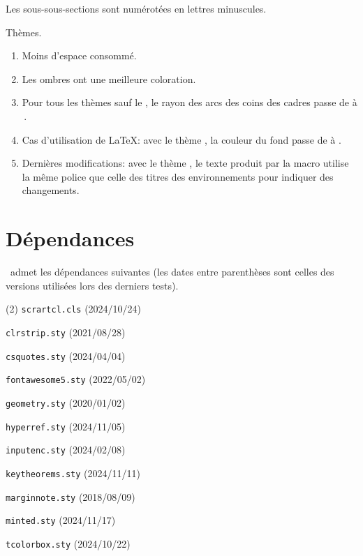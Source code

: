 {\begin{tdocupdate}
	\item Les sous-sous-sections sont numérotées en lettres minuscules.

	\item Thèmes.
	\begin{enumerate}
		\item Moins d'espace consommé.

		\item Les ombres ont une meilleure coloration.

		\item Pour tous les thèmes sauf le , le rayon des arcs des coins des cadres passe de \tdoclatexin{.75mm} à \tdoclatexin{.2pt}\,.

 		\item Cas d'utilisation de \LaTeX: avec le thème , la couleur du fond passe de  à .

		\item Dernières modifications: avec le thème , le texte \tdoclatexin{[Init]} produit par la macro  utilise la même police que celle des titres des environnements pour indiquer des changements.
	\end{enumerate}
\end{tdocupdate}
}


\newpage
\tableofcontents
\newpage


\section{Dépendances}

\thisproj\ admet les dépendances suivantes (les dates entre parenthèses sont celles des versions utilisées lors des derniers tests).
%
\begin{tasks}[style=itemize](2)
    \task \texttt{scrartcl.cls}
    \hfill {\small (2024/10/24)}\kern10pt

    \task \texttt{clrstrip.sty}
    \hfill {\small (2021/08/28)}\kern10pt

    \task \texttt{csquotes.sty}
    \hfill {\small (2024/04/04)}\kern10pt

    \task \texttt{fontawesome5.sty}
    \hfill {\small (2022/05/02)}\kern10pt

    \task \texttt{geometry.sty}
    \hfill {\small (2020/01/02)}\kern10pt

    \task \texttt{hyperref.sty}
    \hfill {\small (2024/11/05)}\kern10pt

    \task \texttt{inputenc.sty}
    \hfill {\small (2024/02/08)}\kern10pt

    \task \texttt{keytheorems.sty}
    \hfill {\small (2024/11/11)}\kern10pt

    \task \texttt{marginnote.sty}
    \hfill {\small (2018/08/09)}\kern10pt

    \task \texttt{minted.sty}
    \hfill {\small (2024/11/17)}\kern10pt

    \task \texttt{tcolorbox.sty}
    \hfill {\small (2024/10/22)}\kern10pt
\end{tasks}


